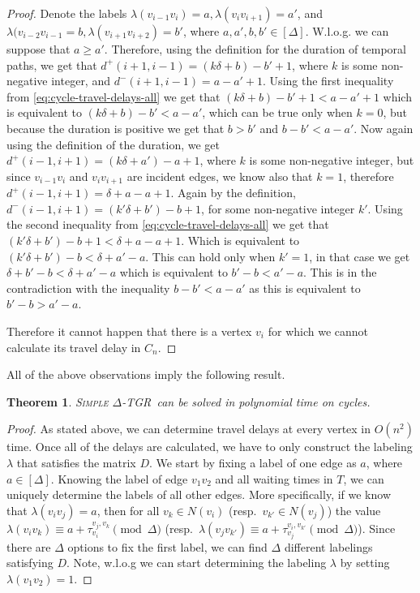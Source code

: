\documentclass[11pt,a4paper]{article}
\newtheorem{theorem}{Theorem}
\theoremstyle{remark}
\theoremstyle{definition}
\newcommand{\deltaExact}{\textsc{Simple $\Delta$-TGR}}
\begin{document}
\begin{proof}
    Denote the labels $\lambda(v_{i-1}v_i) = a, \lambda(v_{i}v_{i+1})=a'$, and $\lambda(v_{i-2}v_{i-1} = b, \lambda (v_{i+1}v_{i+2})=b'$, where $a,a',b,b' \in [\Delta]$.
    W.l.o.g. we can suppose that $a \geq a'$.
    Therefore, using the definition for the duration of temporal paths, we get that
    $d^+(i+1,i-1) = (k \delta + b) - b' + 1$, where $k$ is some non-negative integer, and $d^-(i+1,i-1) = a - a' + 1$.
    Using the first inequality from \cref{eq:cycle-travel-delays-all} we get that 
    $(k \delta + b) - b' +1 < a - a' + 1$ which is equivalent to $(k \delta + b) - b' < a - a'$, which can be true only when $k = 0$, but because the duration is positive we get that $b > b'$ and
    $b - b' < a - a'$.
    Now again using the definition of the duration, we get
    $d^+(i-1,i+1)= (k\delta + a') - a + 1$, where $k$ is some non-negative integer, but since $v_{i-1}v_i$ and $v_iv_{i+1}$ are incident edges, we know also that $k=1$, therefore $d^+(i-1,i+1)= \delta + a - a + 1$. 
    Again by the definition, $d^-(i-1,i+1) = (k' \delta + b') -b + 1$, for some non-negative integer $k'$.
    Using the second inequality from \cref{eq:cycle-travel-delays-all} we get that 
    $(k' \delta + b') -b + 1 < \delta + a - a + 1$.
    Which is equivalent to  $(k' \delta + b') -b < \delta + a' - a $. This can hold only when $k' = 1$, in that case we get $ \delta + b' -b < \delta + a' - a $ which is equivalent to $b' -b < a' - a$.
    This is in the contradiction with the inequality  $b - b' < a - a'$ as this is equivalent to $b'-b > a'-a$.
    
    Therefore it cannot happen that there is a vertex $v_i$ for which we cannot calculate its travel delay in $C_n$.
\end{proof}

All of the above observations imply the following result.
\begin{theorem}
    \deltaExact\ can be solved in polynomial time on cycles.
\end{theorem}

\begin{proof}
As stated above, we can determine travel delays at every vertex in $O(n^2)$ time. 
Once all of the delays are calculated, we have to only construct the labeling $\lambda$ that satisfies the matrix $D$. 
We start by fixing a label of one edge as $a$, where $a \in [\Delta]$.
Knowing the label of edge $v_1v_2$ and all waiting times in $T$, we can uniquely determine the labels of all other edges.
More specifically, if we know that $\lambda(v_i v_j) = a$, then for all $v_k \in N(v_i)$ (resp.~$v_{k'} \in N(v_j)$)
the value $\lambda(v_iv_k) \equiv a + \tau_{v_i}^{v_j,v_k} \pmod \Delta $ (resp.~$\lambda(v_j v_{k'}) \equiv a + \tau_{v_j}^{v_i,v_{k'}} \pmod \Delta $).
Since there are $\Delta$ options to fix the first label, we can find $\Delta$ different labelings satisfying $D$.
Note, w.l.o.g we can start determining the labeling $\lambda$ by setting $\lambda(v_1v_2) = 1$.
\end{proof}
\end{document}
